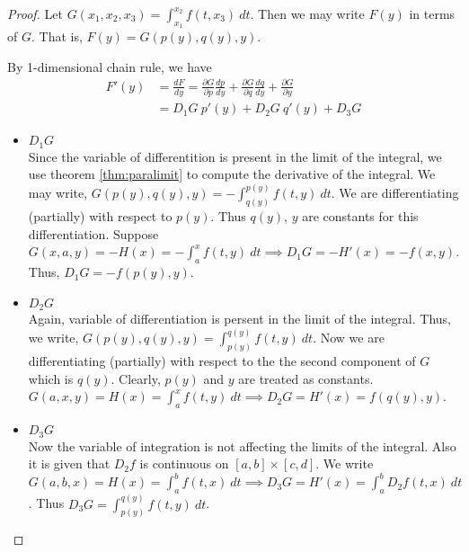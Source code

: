 \begin{proof}
Let $G(x_1,x_2,x_3) = \int_{x_1}^{x_2} f(t,x_3)\ dt$.
Then we may write $F(y)$ in terms of $G$.
That is, $F(y) = G(p(y),q(y),y)$.

By 1-dimensional chain rule, we have 
\begin{align*}
	F'(y) & = \frac{dF}{dy} = \frac{\partial G}{\partial p} \frac{dp}{dy} + \frac{\partial G}{\partial q} \frac{dq}{dy} + \frac{\partial G}{\partial y} \\
	& = D_1 G\ p'(y) + D_2 G\ q'(y) + D_3 G
\end{align*}

\begin{itemize}
	\item $D_1 G$\\ 
	Since the variable of differentition is present in the limit of the integral, we use theorem \ref{thm:paralimit} to compute the derivative of the integral.
	We may write, $G(p(y),q(y),y)  = -\int_{q(y)}^{p(y)} f(t,y)\ dt$.
	We are differentiating (partially) with respect to $p(y)$.
	Thus $q(y)$, $y$ are constants for this differentiation.
	Suppose $G(x,a,y) = -H(x) = -\int_a^x f(t,y)\ dt \implies D_1 G = -H'(x)= -f(x,y)$.
	Thus, $D_1 G = -f(p(y),y)$.
	\item $D_2 G$\\
	Again, variable of differentiation is persent in the limit of the integral.
	Thus, we write, $G(p(y),q(y),y) = \int_{p(y)}^{q(y)} f(t,y)\ dt$.
	Now we are differentiating (partially) with respect to the the second component of $G$ which is $q(y)$.
	Clearly, $p(y)$ and $y$ are treated as constants.
	$G(a,x,y) = H(x) = \int_a^x f(t,y)\ dt \implies D_2 G = H'(x) = f(q(y),y)$.
	\item $D_3 G$\\
	Now the variable of integration is not affecting the limits of the integral.
	Also it is given that $D_2 f$ is continuous on $[a,b] \times [c,d]$.
	We write $G(a,b,x) = H(x) = \int_a^b f(t,x)\ dt \implies D_3 G = H'(x) = \int_a^b D_2 f(t,x)\ dt$.
	Thus $D_3 G = \int_{p(y)}^{q(y)} f(t,y)\ dt$.
\end{itemize}
\end{proof}

